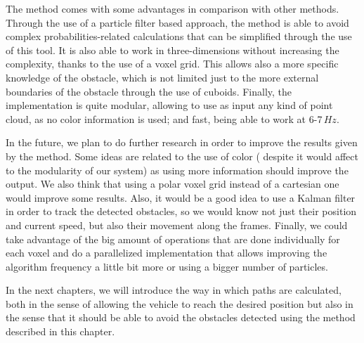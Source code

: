 The method comes with some advantages in comparison with other methods. Through the use of a particle filter based approach, the method is able to avoid complex probabilities-related calculations that can be simplified through the use of this tool. It is also able to work in three-dimensions without increasing the complexity, thanks to the use of a voxel grid. This allows also a more specific knowledge of the obstacle, which is not limited just to the more external boundaries of the obstacle through the use of cuboids. Finally, the implementation is quite modular, allowing to use as input any kind of point cloud, as no color information is used; and fast, being able to work at 6-7\,$Hz$.

In the future, we plan to do further research in order to improve the results given by the method. Some ideas are related to the use of color ( despite it would affect to the modularity of our system) as using more information should improve the output. We also think that using a polar voxel grid instead of a cartesian one would improve some results. Also, it would be a good idea to use a Kalman filter in order to track the detected obstacles, so we would know not just their position and current speed, but also their movement along the frames. Finally, we could take advantage of the big amount of operations that are done individually for each voxel and do a parallelized implementation that allows improving the algorithm frequency a little bit more or using a bigger number of particles.

In the next chapters, we will introduce the way in which paths are calculated, both in the sense of allowing the vehicle to reach the desired position but also in the sense that it should be able to avoid the obstacles detected using the method described in this chapter.
 
 
 
 